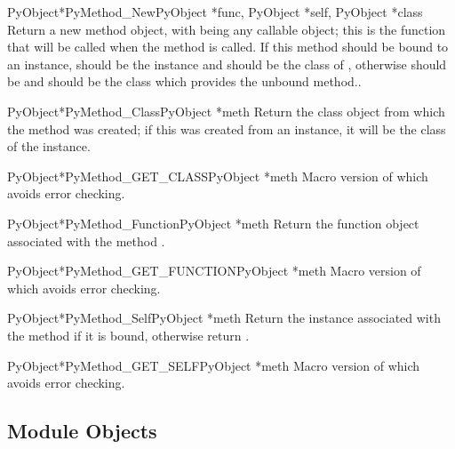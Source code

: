 \begin{cfuncdesc}{PyObject*}{PyMethod_New}{PyObject *func,
                                           PyObject *self, PyObject *class}
  Return a new method object, with  being any callable
  object; this is the function that will be called when the method is
  called.  If this method should be bound to an instance, 
  should be the instance and  should be the class of
  , otherwise  should be \NULL{} and 
  should be the class which provides the unbound method..
\end{cfuncdesc}

\begin{cfuncdesc}{PyObject*}{PyMethod_Class}{PyObject *meth}
  Return the class object from which the method  was
  created; if this was created from an instance, it will be the class
  of the instance.
\end{cfuncdesc}

\begin{cfuncdesc}{PyObject*}{PyMethod_GET_CLASS}{PyObject *meth}
  Macro version of  which avoids error
  checking.
\end{cfuncdesc}

\begin{cfuncdesc}{PyObject*}{PyMethod_Function}{PyObject *meth}
  Return the function object associated with the method .
\end{cfuncdesc}

\begin{cfuncdesc}{PyObject*}{PyMethod_GET_FUNCTION}{PyObject *meth}
  Macro version of  which avoids error
  checking.
\end{cfuncdesc}

\begin{cfuncdesc}{PyObject*}{PyMethod_Self}{PyObject *meth}
  Return the instance associated with the method  if it is
  bound, otherwise return \NULL{}.
\end{cfuncdesc}

\begin{cfuncdesc}{PyObject*}{PyMethod_GET_SELF}{PyObject *meth}
  Macro version of  which avoids error
  checking.
\end{cfuncdesc}


\subsection{Module Objects \label{moduleObjects}}

